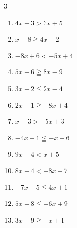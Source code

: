 \begin{multicols}{3}
\begin{enumerate}

  \item $4x-3>3x+5$

        \phantom{$\displaystyle x>8$}

  \item $x-8\geqq 4x-2$

        \phantom{$\displaystyle x\leqq -2$}

  \item $-8x+6<-5x+4$


  \item $5x+6\geqq 8x-9$

        \phantom{$\displaystyle x\leqq 5$}

  \item $3x-2\leqq 2x-4$

        \phantom{$\displaystyle x\leqq -2$}

  \item $2x+1\geqq -8x+4$


\columnbreak %

\resetques

  \item $x-3>-5x+3$

        \phantom{$\displaystyle x>1$}

  \item $-4x-1\leqq -x-6$


  \item $9x+4<x+5$


  \item $8x-4<-8x-7$


  \item $-7x-5\leqq 4x+1$


  \item $5x+8\leqq -6x+9$


  \item $3x-9\geqq -x+1$


\end{enumerate}
\end{multicols}
